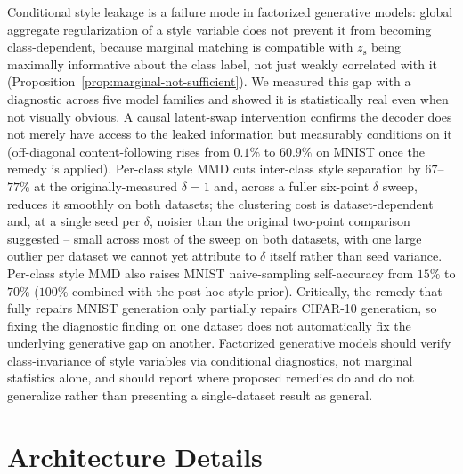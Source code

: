 \documentclass[10pt,letterpaper]{article}
\newcommand{\zs}{z_{\mathrm{s}}}
\begin{document}
Conditional style leakage is a failure mode in factorized generative
models: global aggregate regularization of a style variable does not
prevent it from becoming class-dependent, because marginal matching is
compatible with $\zs$ being maximally informative about the class label,
not just weakly correlated with it (Proposition~\ref{prop:marginal-not-sufficient}).
We measured this gap with a diagnostic across five model families and
showed it is statistically real even when not visually obvious. A causal
latent-swap intervention confirms the decoder does not merely have access
to the leaked information but measurably conditions on it (off-diagonal
content-following rises from $0.1\%$ to $60.9\%$ on MNIST once the remedy
is applied). Per-class style MMD cuts inter-class style separation by
$67$--$77\%$ at the originally-measured $\delta{=}1$ and, across a fuller
six-point $\delta$ sweep, reduces it smoothly on both datasets; the
clustering cost is dataset-dependent and, at a single seed per $\delta$,
noisier than the original two-point comparison suggested -- small across
most of the sweep on both datasets, with one large outlier per dataset we
cannot yet attribute to $\delta$ itself rather than seed variance. Per-class
style MMD also raises MNIST naive-sampling self-accuracy from $15\%$ to
$70\%$ ($100\%$ combined with the post-hoc style prior). Critically, the remedy
that fully repairs MNIST generation only partially repairs CIFAR-10
generation, so fixing the diagnostic finding on one dataset does not
automatically fix the underlying generative gap on another. Factorized
generative models should verify class-invariance of style variables via
conditional diagnostics, not marginal statistics alone, and should report
where proposed remedies do and do not generalize rather than presenting a
single-dataset result as general.




\appendix

\section{Architecture Details}
\label{app:arch}
\end{document}
